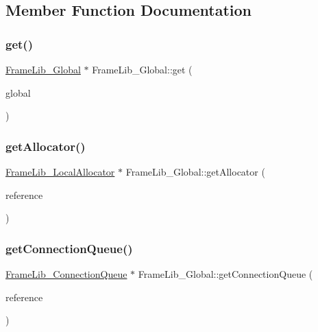 \subsection{Member Function Documentation}
\mbox{\label{class_frame_lib___global_ac9a895677da386e8fde525c061a854e4}} 
\subsubsection{\texorpdfstring{get()}{get()}}
{\footnotesize\ttfamily \hyperlink{class_frame_lib___global}{Frame\+Lib\+\_\+\+Global} $\ast$ Frame\+Lib\+\_\+\+Global\+::get (\begin{DoxyParamCaption}\item[{\hyperlink{class_frame_lib___global}{Frame\+Lib\+\_\+\+Global} $\ast$$\ast$}]{global }\end{DoxyParamCaption})\hspace{0.3cm}{\ttfamily [static]}}

\mbox{\label{class_frame_lib___global_a31c3fae37e27c9cce286d30ed30838d3}} 
\subsubsection{\texorpdfstring{get\+Allocator()}{getAllocator()}}
{\footnotesize\ttfamily \hyperlink{class_frame_lib___local_allocator}{Frame\+Lib\+\_\+\+Local\+Allocator} $\ast$ Frame\+Lib\+\_\+\+Global\+::get\+Allocator (\begin{DoxyParamCaption}\item[{void $\ast$}]{reference }\end{DoxyParamCaption})}

\mbox{\label{class_frame_lib___global_ae0cfe1ff49ba163758fcb66f9e94b991}} 
\subsubsection{\texorpdfstring{get\+Connection\+Queue()}{getConnectionQueue()}}
{\footnotesize\ttfamily \hyperlink{class_frame_lib___connection_queue}{Frame\+Lib\+\_\+\+Connection\+Queue} $\ast$ Frame\+Lib\+\_\+\+Global\+::get\+Connection\+Queue (\begin{DoxyParamCaption}\item[{void $\ast$}]{reference }\end{DoxyParamCaption})}

